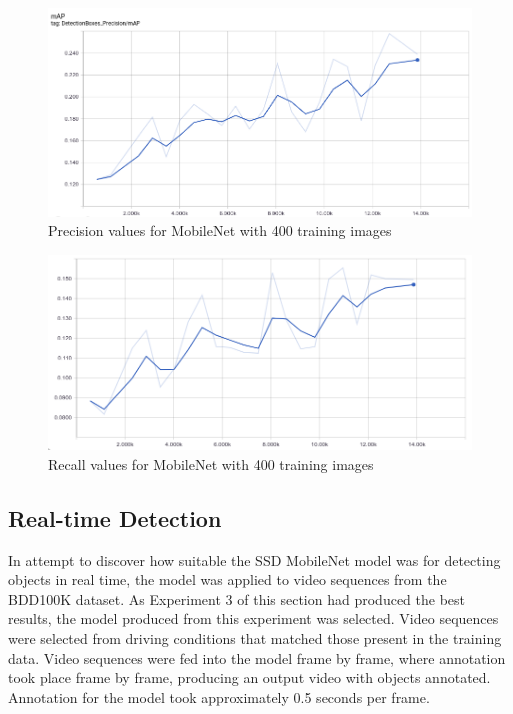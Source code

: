\documentclass[12pt]{report}
\begin{document}
\vspace{0.5cm}
\begin{figure}[ht!]
	\centering
	\includegraphics[width=15cm]{precision-mobilenet-2}
	\caption{Precision values for MobileNet with 400 training images}
	\label{fig:precision-mobilenet-2}
\end{figure}

\vspace{0.5cm}
\begin{figure}[ht!]
	\centering
	\includegraphics[width=15cm]{recall-mobilenet-2}
	\caption{Recall values for MobileNet with 400 training images}
	\label{fig:recall-mobilenet-2}
\end{figure}

\clearpage
\subsection{Real-time Detection}
\begin{flushleft}
In attempt to discover how suitable the SSD MobileNet model was for detecting objects in real time, the model was applied to video sequences from the BDD100K dataset. As Experiment 3 of this section had produced the best results, the model produced from this experiment was selected. Video sequences were selected from driving conditions that matched those present in the training data. Video sequences were fed into the model frame by frame, where annotation took place frame by frame, producing an output video with objects annotated. Annotation for the model took approximately 0.5 seconds per frame.
\end{flushleft}
\end{document}
